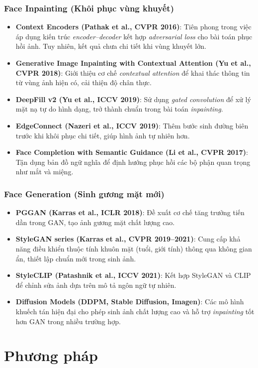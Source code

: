 \documentclass[12pt,a4paper]{article}
\begin{document}
	\subsubsection{Face Inpainting (Khôi phục vùng khuyết)}
	\begin{itemize}
		\item \textbf{Context Encoders (Pathak et al., CVPR 2016)}: Tiên phong trong việc áp dụng kiến trúc \textit{encoder–decoder} kết hợp \textit{adversarial loss} cho bài toán phục hồi ảnh. Tuy nhiên, kết quả chưa chi tiết khi vùng khuyết lớn.
		
		\item \textbf{Generative Image Inpainting with Contextual Attention (Yu et al., CVPR 2018)}: Giới thiệu cơ chế \textit{contextual attention} để khai thác thông tin từ vùng ảnh hiện có, cải thiện độ chân thực.
		
		\item \textbf{DeepFill v2 (Yu et al., ICCV 2019)}: Sử dụng \textit{gated convolution} để xử lý mặt nạ tự do hình dạng, trở thành chuẩn trong bài toán \textit{inpainting}.
		
		\item \textbf{EdgeConnect (Nazeri et al., ICCV 2019)}: Thêm bước sinh đường biên trước khi khôi phục chi tiết, giúp hình ảnh tự nhiên hơn.
		
		\item \textbf{Face Completion with Semantic Guidance (Li et al., CVPR 2017)}: Tận dụng bản đồ ngữ nghĩa để định hướng phục hồi các bộ phận quan trọng như mắt và miệng.
	\end{itemize}
	
	\subsubsection{Face Generation (Sinh gương mặt mới)}
	\begin{itemize}
		\item \textbf{PGGAN (Karras et al., ICLR 2018)}: Đề xuất cơ chế tăng trưởng tiến dần trong GAN, tạo ảnh gương mặt chất lượng cao.
		
		\item \textbf{StyleGAN series (Karras et al., CVPR 2019–2021)}: Cung cấp khả năng điều khiển thuộc tính khuôn mặt (tuổi, giới tính) thông qua không gian ẩn, thiết lập chuẩn mới trong sinh ảnh.
		
		\item \textbf{StyleCLIP (Patashnik et al., ICCV 2021)}: Kết hợp StyleGAN và CLIP để chỉnh sửa ảnh dựa trên mô tả ngôn ngữ tự nhiên.
		
		\item \textbf{Diffusion Models (DDPM, Stable Diffusion, Imagen)}: Các mô hình khuếch tán hiện đại cho phép sinh ảnh chất lượng cao và hỗ trợ \textit{inpainting} tốt hơn GAN trong nhiều trường hợp.
	\end{itemize}
	
	\section{Phương pháp}
\end{document}
